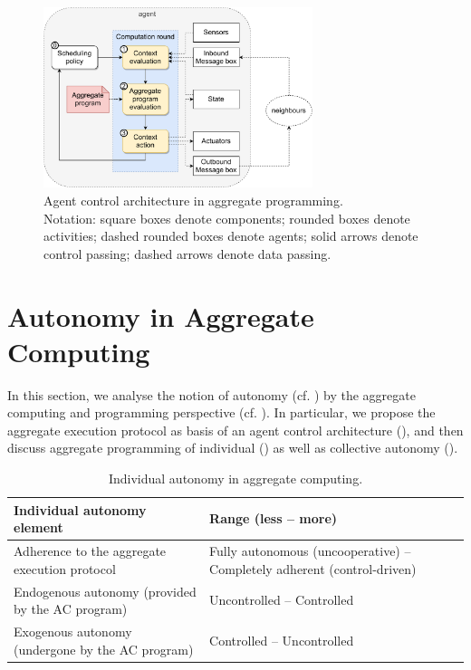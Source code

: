 \begin{figure}
\centering
\includegraphics[width=0.7\textwidth]{papers/mdpi2020/imgs/aggregate-agent-control-architecture.pdf}
\caption{Agent control architecture in aggregate programming.\\ 
Notation: square boxes denote components; rounded boxes denote activities; dashed rounded boxes denote agents; solid arrows denote control passing; dashed arrows denote data passing.}
\label{fig:aggregate-control-arch}
\end{figure}

\section{Autonomy in Aggregate Computing}
\label{s:autonomy-ac}

In this section,
 we analyse the notion of autonomy (cf. )
 by the aggregate computing and programming perspective (cf. ).
%
In particular, we 
 propose the aggregate execution protocol 
  as basis of an agent control architecture (), and then
 discuss aggregate programming of individual ()
 as well as collective autonomy ().
 

\begin{table}
\centering
\begin{tabularx}{1\textwidth}{|p{}|p{}|} %
\hline
\textbf{Individual autonomy element} & \textbf{Range (less -- more)}
\\\hline
Adherence to the aggregate execution protocol & Fully autonomous (uncooperative) -- Completely adherent (control-driven)
\\\hline
Endogenous autonomy (provided by the AC program) & Uncontrolled -- Controlled
\\\hline
Exogenous autonomy (undergone by the AC program) & Controlled -- Uncontrolled
\\\hline
\end{tabularx} 
\caption{Individual autonomy in aggregate computing.}
\label{table:summary-ac-individual-autonomy}
\end{table}

